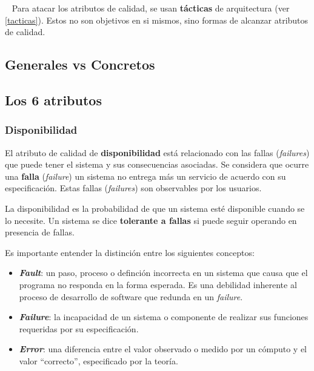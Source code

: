 \documentclass[]{article}
\begin{document}
~\newline
Para atacar los atributos de calidad, se usan \textbf{tácticas} de arquitectura (ver \ref{tacticas}). Estos no son objetivos en si mismos, sino formas de alcanzar atributos de calidad.

\subsection{Generales vs Concretos}


\subsection{Los 6 atributos}
\subsubsection{Disponibilidad}
El atributo de calidad de \textbf{disponibilidad} está relacionado con las fallas (\emph{failures}) que puede tener el sistema y sus consecuencias asociadas. Se considera que ocurre una \textbf{falla} (\emph{failure}) un sistema no entrega más un servicio de acuerdo con su especificación. Estas fallas (\emph{failures}) son observables por los usuarios.

La disponibilidad es la probabilidad de que un sistema esté disponible cuando se lo necesite. Un sistema se dice \textbf{tolerante a fallas} si puede seguir operando en presencia de fallas.

Es importante entender la distinción entre los siguientes conceptos:
\begin{itemize}
	\item \emph{\textbf{Fault}}: un paso, proceso o definción incorrecta en un sistema que causa que el programa no responda en la forma esperada. Es una debilidad inherente al proceso de desarrollo de software que redunda en un \emph{failure}.
	\item \emph{\textbf{Failure}}: la incapacidad de un sistema o componente de realizar sus funciones requeridas por su especificación.
	\item \emph{\textbf{Error}}: una diferencia entre el valor observado o medido por un cómputo y el valor ``correcto'', especificado por la teoría.
\end{itemize}
\end{document}
